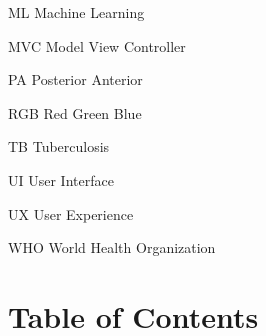 \documentclass{article} %
\begin{document}
\noindent ML  Machine Learning

\noindent MVC  Model View Controller

\noindent PA  Posterior Anterior

\noindent RGB  Red Green Blue

\noindent TB  Tuberculosis

\noindent UI  User Interface

\noindent UX  User Experience

\noindent WHO  World Health Organization

\noindent \textbf{}

\noindent \textbf{}

\noindent \textbf{\eject }

\noindent 
\section{Table of Contents}
\end{document}
